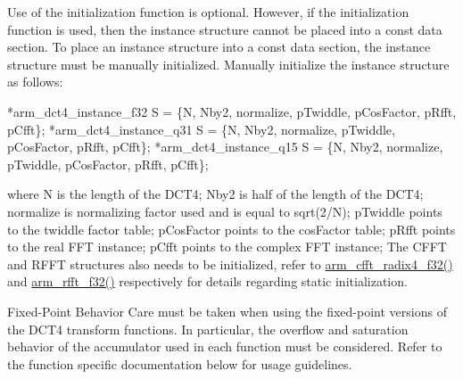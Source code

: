 \begin{DoxyParagraph}{}
Use of the initialization function is optional. However, if the initialization function is used, then the instance structure cannot be placed into a const data section. To place an instance structure into a const data section, the instance structure must be manually initialized. Manually initialize the instance structure as follows\-: 
\begin{DoxyPre}    
*arm\_dct4\_instance\_f32 S = \{N, Nby2, normalize, pTwiddle, pCosFactor, pRfft, pCfft\};    
*arm\_dct4\_instance\_q31 S = \{N, Nby2, normalize, pTwiddle, pCosFactor, pRfft, pCfft\};   
*arm\_dct4\_instance\_q15 S = \{N, Nby2, normalize, pTwiddle, pCosFactor, pRfft, pCfft\};   
  \end{DoxyPre}
 where {\ttfamily N} is the length of the D\-C\-T4; {\ttfamily Nby2} is half of the length of the D\-C\-T4; {\ttfamily normalize} is normalizing factor used and is equal to {\ttfamily sqrt(2/\-N)}; {\ttfamily p\-Twiddle} points to the twiddle factor table; {\ttfamily p\-Cos\-Factor} points to the cos\-Factor table; {\ttfamily p\-Rfft} points to the real F\-F\-T instance; {\ttfamily p\-Cfft} points to the complex F\-F\-T instance; The C\-F\-F\-T and R\-F\-F\-T structures also needs to be initialized, refer to \hyperlink{group___radix4___c_f_f_t___c_i_f_f_t_ga521f670cd9c571bc61aff9bec89f4c26}{arm\-\_\-cfft\-\_\-radix4\-\_\-f32()} and \hyperlink{group___r_f_f_t___r_i_f_f_t_ga3df1766d230532bc068fc4ed69d0fcdc}{arm\-\_\-rfft\-\_\-f32()} respectively for details regarding static initialization.
\end{DoxyParagraph}
\begin{DoxyParagraph}{Fixed-\/\-Point Behavior }
Care must be taken when using the fixed-\/point versions of the D\-C\-T4 transform functions. In particular, the overflow and saturation behavior of the accumulator used in each function must be considered. Refer to the function specific documentation below for usage guidelines. 
\end{DoxyParagraph}


